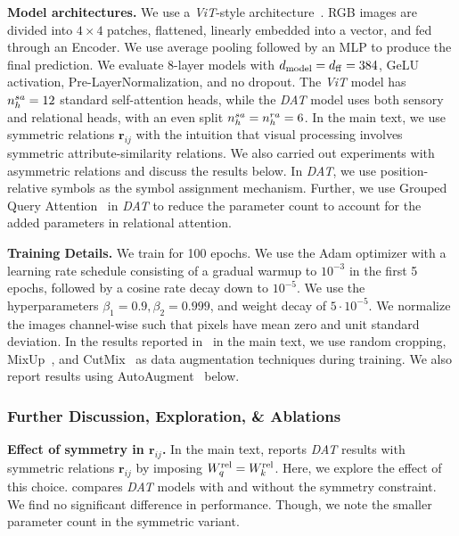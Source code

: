 \textbf{Model architectures.} We use a \textit{ViT}-style architecture~\citep{dosovitskiyImageWorth16x162020}. RGB images are divided into $4 \times 4$ patches, flattened, linearly embedded into a vector, and fed through an Encoder. We use average pooling followed by an MLP to produce the final prediction. We evaluate 8-layer models with $d_{\mathrm{model}} = d_{\mathrm{ff}} = 384$, GeLU activation, Pre-LayerNormalization, and no dropout. The \textit{ViT} model has $n_h^{sa} = 12$ standard self-attention heads, while the \textit{DAT} model uses both sensory and relational heads, with an even split $n_h^{sa} = n_h^{ra} = 6$. In the main text, we use symmetric relations $\bm{r}_{ij}$ with the intuition that visual processing involves symmetric attribute-similarity relations. We also carried out experiments with asymmetric relations and discuss the results below. In \textit{DAT}, we use position-relative symbols as the symbol assignment mechanism. Further, we use Grouped Query Attention~\citep{ainslie-etal-2023-gqa} in \textit{DAT} to reduce the parameter count to account for the added parameters in relational attention.

\textbf{Training Details.} We train for 100 epochs. We use the Adam optimizer with a learning rate schedule consisting of a gradual warmup to $10^{-3}$ in the first 5 epochs, followed by a cosine rate decay down to $10^{-5}$. We use the hyperparameters $\beta_1 = 0.9, \beta_2 = 0.999$, and weight decay of $5 \cdot 10^{-5}$. We normalize the images channel-wise such that pixels have mean zero and unit standard deviation. In the results reported in~ in the main text, we use random cropping, MixUp~\citep{zhang2018mixup}, and CutMix~\citep{yun2019cutmix} as data augmentation techniques during training. We also report results using AutoAugment~\citep{cubuk2019autoaugmentlearningaugmentationpolicies} below.

\subsubsection*{Further Discussion, Exploration, \& Ablations}

\textbf{Effect of symmetry in $\bm{r}_{ij}$.} In the main text,  reports \textit{DAT} results with symmetric relations $\bm{r}_{ij}$ by imposing $W_q^{\mathrm{rel}} = W_k^{\mathrm{rel}}$. Here, we explore the effect of this choice.  compares \textit{DAT} models with and without the symmetry constraint. We find no significant difference in performance. Though, we note the smaller parameter count in the symmetric variant.


